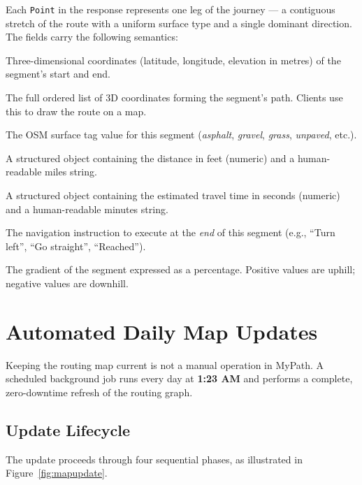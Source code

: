 \documentclass[12pt, a4paper]{report}
\begin{document}
Each \texttt{Point} in the response represents one leg of the journey — a contiguous stretch of the route with a uniform surface type and a single dominant direction. The fields carry the following semantics:

\begin{description}[leftmargin=*, style=nextline]
  \item[\texttt{start\_location} / \texttt{end\_location}] Three-dimensional coordinates (latitude, longitude, elevation in metres) of the segment's start and end.
  \item[\texttt{points}] The full ordered list of 3D coordinates forming the segment's path. Clients use this to draw the route on a map.
  \item[\texttt{surface}] The OSM surface tag value for this segment (\textit{asphalt}, \textit{gravel}, \textit{grass}, \textit{unpaved}, etc.).
  \item[\texttt{distance}] A structured object containing the distance in feet (numeric) and a human-readable miles string.
  \item[\texttt{duration}] A structured object containing the estimated travel time in seconds (numeric) and a human-readable minutes string.
  \item[\texttt{maneuver}] The navigation instruction to execute at the \emph{end} of this segment (e.g., ``Turn left'', ``Go straight'', ``Reached'').
  \item[\texttt{incline}] The gradient of the segment expressed as a percentage. Positive values are uphill; negative values are downhill.
\end{description}

\section{Automated Daily Map Updates}
\label{sec:mapupdate}

Keeping the routing map current is not a manual operation in MyPath. A scheduled background job runs every day at \textbf{1:23 AM} and performs a complete, zero-downtime refresh of the routing graph.

\subsection{Update Lifecycle}
\label{subsec:updatelifecycle}

The update proceeds through four sequential phases, as illustrated in Figure~\ref{fig:mapupdate}.
\end{document}
